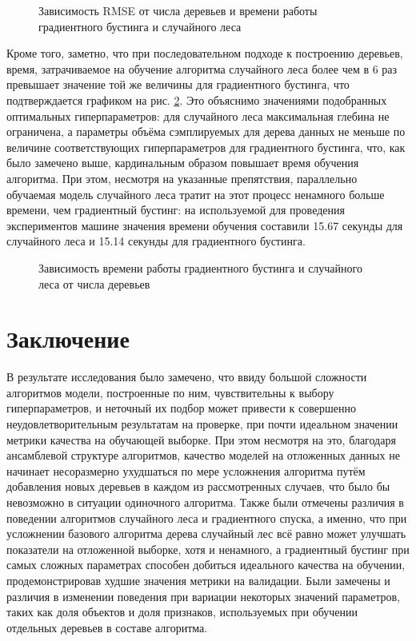\documentclass[a4paper, 14pt]{article}
\begin{document}
    \begin{figure}[h]
      \centering
      
      \caption{Зависимость RMSE от числа деревьев и времени работы градиентного бустинга и случайного леса}\label{gb_vs_rf}
    \end{figure}

    Кроме того, заметно, что при последовательном подходе к построению деревьев, время, затрачиваемое на обучение алгоритма случайного леса более чем в 6 раз превышает значение той же величины для градиентного бустинга, что подтверждается графиком на рис. \ref{gb_vs_rf_time}. Это объяснимо значениями подобранных оптимальных гиперпараметров: для случайного леса максимальная глебина не ограничена, а параметры объёма сэмплируемых для дерева данных не меньше по величине соответствующих гиперпараметров для градиентного бустинга, что, как было замечено выше, кардинальным образом повышает время обучения алгоритма. При этом, несмотря на указанные препятствия, параллельно обучаемая модель случайного леса тратит на этот процесс ненамного больше времени, чем градиентный бустинг: на используемой для проведения экспериментов машине значения времени обучения составили 15.67 секунды для случайного леса и 15.14 секунды для градиентного бустинга.

    \begin{figure}[h]
      \centering
      
      \caption{Зависимость времени работы градиентного бустинга и случайного леса от числа деревьев}\label{gb_vs_rf_time}
    \end{figure}

\section{Заключение}

    В результате исследования было замечено, что ввиду большой сложности алгоритмов модели, построенные по ним, чувствительны к выбору гиперпараметров, и неточный их подбор может привести к совершенно неудовлетворительным результатам на проверке, при почти идеальном значении метрики качества на обучающей выборке. При этом несмотря на это, благодаря ансамблевой структуре алгоритмов, качество моделей на отложенных данных не начинает несоразмерно ухудшаться по мере усложнения алгоритма путём добавления новых деревьев в каждом из рассмотренных случаев, что было бы невозможно в ситуации одиночного алгоритма. Также были отмечены различия в поведении алгоритмов случайного леса и градиентного спуска, а именно, что при усложнении базового алгоритма дерева случайный лес всё равно может улучшать показатели на отложенной выборке, хотя и ненамного, а градиентный бустинг при самых сложных параметрах способен добиться идеального качества на обучении, продемонстрировав худшие значения метрики на валидации. Были замечены и различия в изменении поведения при вариации некоторых значений параметров, таких как доля объектов и доля признаков, используемых при обучении отдельных деревьев в составе алгоритма.
\end{document}
